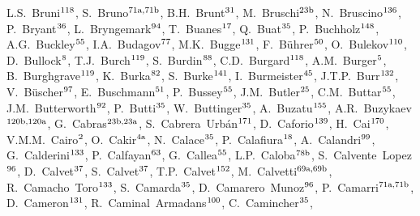 \begin{flushleft}
L.S.~Bruni$^\textrm{\scriptsize 118}$,    
S.~Bruno$^\textrm{\scriptsize 71a,71b}$,    
B.H.~Brunt$^\textrm{\scriptsize 31}$,    
M.~Bruschi$^\textrm{\scriptsize 23b}$,    
N.~Bruscino$^\textrm{\scriptsize 136}$,    
P.~Bryant$^\textrm{\scriptsize 36}$,    
L.~Bryngemark$^\textrm{\scriptsize 94}$,    
T.~Buanes$^\textrm{\scriptsize 17}$,    
Q.~Buat$^\textrm{\scriptsize 35}$,    
P.~Buchholz$^\textrm{\scriptsize 148}$,    
A.G.~Buckley$^\textrm{\scriptsize 55}$,    
I.A.~Budagov$^\textrm{\scriptsize 77}$,    
M.K.~Bugge$^\textrm{\scriptsize 131}$,    
F.~B\"uhrer$^\textrm{\scriptsize 50}$,    
O.~Bulekov$^\textrm{\scriptsize 110}$,    
D.~Bullock$^\textrm{\scriptsize 8}$,    
T.J.~Burch$^\textrm{\scriptsize 119}$,    
S.~Burdin$^\textrm{\scriptsize 88}$,    
C.D.~Burgard$^\textrm{\scriptsize 118}$,    
A.M.~Burger$^\textrm{\scriptsize 5}$,    
B.~Burghgrave$^\textrm{\scriptsize 119}$,    
K.~Burka$^\textrm{\scriptsize 82}$,    
S.~Burke$^\textrm{\scriptsize 141}$,    
I.~Burmeister$^\textrm{\scriptsize 45}$,    
J.T.P.~Burr$^\textrm{\scriptsize 132}$,    
V.~B\"uscher$^\textrm{\scriptsize 97}$,    
E.~Buschmann$^\textrm{\scriptsize 51}$,    
P.~Bussey$^\textrm{\scriptsize 55}$,    
J.M.~Butler$^\textrm{\scriptsize 25}$,    
C.M.~Buttar$^\textrm{\scriptsize 55}$,    
J.M.~Butterworth$^\textrm{\scriptsize 92}$,    
P.~Butti$^\textrm{\scriptsize 35}$,    
W.~Buttinger$^\textrm{\scriptsize 35}$,    
A.~Buzatu$^\textrm{\scriptsize 155}$,    
A.R.~Buzykaev$^\textrm{\scriptsize 120b,120a}$,    
G.~Cabras$^\textrm{\scriptsize 23b,23a}$,    
S.~Cabrera~Urb\'an$^\textrm{\scriptsize 171}$,    
D.~Caforio$^\textrm{\scriptsize 139}$,    
H.~Cai$^\textrm{\scriptsize 170}$,    
V.M.M.~Cairo$^\textrm{\scriptsize 2}$,    
O.~Cakir$^\textrm{\scriptsize 4a}$,    
N.~Calace$^\textrm{\scriptsize 35}$,    
P.~Calafiura$^\textrm{\scriptsize 18}$,    
A.~Calandri$^\textrm{\scriptsize 99}$,    
G.~Calderini$^\textrm{\scriptsize 133}$,    
P.~Calfayan$^\textrm{\scriptsize 63}$,    
G.~Callea$^\textrm{\scriptsize 55}$,    
L.P.~Caloba$^\textrm{\scriptsize 78b}$,    
S.~Calvente~Lopez$^\textrm{\scriptsize 96}$,    
D.~Calvet$^\textrm{\scriptsize 37}$,    
S.~Calvet$^\textrm{\scriptsize 37}$,    
T.P.~Calvet$^\textrm{\scriptsize 152}$,    
M.~Calvetti$^\textrm{\scriptsize 69a,69b}$,    
R.~Camacho~Toro$^\textrm{\scriptsize 133}$,    
S.~Camarda$^\textrm{\scriptsize 35}$,    
D.~Camarero~Munoz$^\textrm{\scriptsize 96}$,    
P.~Camarri$^\textrm{\scriptsize 71a,71b}$,    
D.~Cameron$^\textrm{\scriptsize 131}$,    
R.~Caminal~Armadans$^\textrm{\scriptsize 100}$,    
C.~Camincher$^\textrm{\scriptsize 35}$,    

\end{flushleft}
